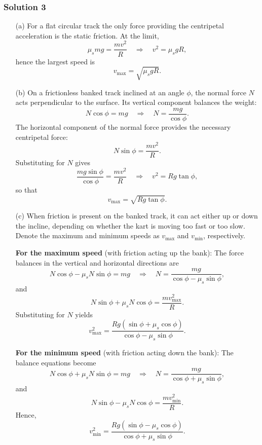 \documentclass{article}
\begin{document}
\subsubsection{Solution 3}
\begin{enumerate}
    \item[(a)] 
    For a flat circular track the only force providing the centripetal acceleration is the static friction. At the limit,
    \[
    \mu_s mg = \frac{mv^2}{R} \quad \Longrightarrow \quad v^2 = \mu_s g R,
    \]
    hence the largest speed is 
    \[
    v_{\max} = \sqrt{\mu_s g R}.
    \]
    
    \item[(b)]
    On a frictionless banked track inclined at an angle $\phi$, the normal force $N$ acts perpendicular to the surface. Its vertical component balances the weight:
    \[
    N\cos\phi = mg \quad \Longrightarrow \quad N = \frac{mg}{\cos\phi}.
    \]
    The horizontal component of the normal force provides the necessary centripetal force:
    \[
    N\sin\phi = \frac{mv^2}{R}.
    \]
    Substituting for $N$ gives
    \[
    \frac{mg\sin\phi}{\cos\phi} = \frac{mv^2}{R} \quad \Longrightarrow \quad v^2 = Rg\tan\phi,
    \]
    so that
    \[
    v_{\max} = \sqrt{Rg\tan\phi}.
    \]
    
    \item[(c)]
    When friction is present on the banked track, it can act either up or down the incline, depending on whether the kart is moving too fast or too slow. Denote the maximum and minimum speeds as $v_{\max}$ and $v_{\min}$, respectively.
    
    \textbf{For the maximum speed} (with friction acting up the bank): The force balances in the vertical and horizontal directions are
    \[
    N\cos\phi - \mu_s N\sin\phi = mg \quad \Longrightarrow \quad N = \frac{mg}{\cos\phi - \mu_s \sin\phi},
    \]
    and
    \[
    N\sin\phi + \mu_s N\cos\phi = \frac{mv_{\max}^2}{R}.
    \]
    Substituting for $N$ yields
    \[
    v_{\max}^2 = \frac{Rg\left(\sin\phi + \mu_s\cos\phi\right)}{\cos\phi - \mu_s\sin\phi}.
    \]
    
    \textbf{For the minimum speed} (with friction acting down the bank): The balance equations become
    \[
    N\cos\phi + \mu_s N\sin\phi = mg \quad \Longrightarrow \quad N = \frac{mg}{\cos\phi + \mu_s\sin\phi},
    \]
    and
    \[
    N\sin\phi - \mu_s N\cos\phi = \frac{mv_{\min}^2}{R}.
    \]
    Hence,
    \[
    v_{\min}^2 = \frac{Rg\left(\sin\phi - \mu_s\cos\phi\right)}{\cos\phi + \mu_s\sin\phi}.
    \]
    

\end{enumerate}
\end{document}

